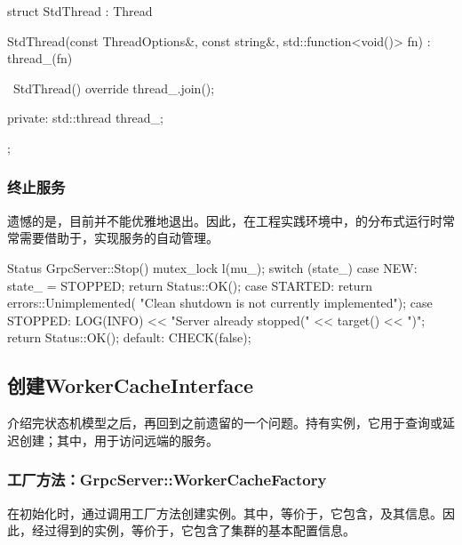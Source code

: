 \begin{content}
\begin{leftbar}
\begin{c++}
struct StdThread : Thread {
  StdThread(const ThreadOptions&, const string&, 
      std::function<void()> fn)
    : thread_(fn) {
  }

  ~StdThread() override { 
    thread_.join(); 
  }

 private:
  std::thread thread_;
};
\end{c++}
\end{leftbar}

\subsubsection{终止服务}

遗憾的是，目前并不能优雅地退出。因此，在工程实践环境中，\tf{}的分布式运行时常常需要借助于，实现服务的自动管理。

\begin{leftbar}
\begin{c++}
Status GrpcServer::Stop() {
  mutex_lock l(mu_);
  switch (state_) {
    case NEW:
      state_ = STOPPED;
      return Status::OK();
    case STARTED:
      return errors::Unimplemented(
          "Clean shutdown is not currently implemented");
    case STOPPED:
      LOG(INFO) << "Server already stopped(" << target() << ")";
      return Status::OK();
    default:
      CHECK(false);
  }
}
\end{c++}
\end{leftbar}

\subsection{创建WorkerCacheInterface}

介绍完状态机模型之后，再回到之前遗留的一个问题。持有实例，它用于查询或延迟创建；其中，用于访问远端的服务。

\subsubsection{工厂方法：GrpcServer::WorkerCacheFactory}

在初始化时，通过调用工厂方法创建实例。其中，等价于，它包含，及其信息。因此，经过得到的实例，等价于，它包含了集群的基本配置信息。


\end{content}
